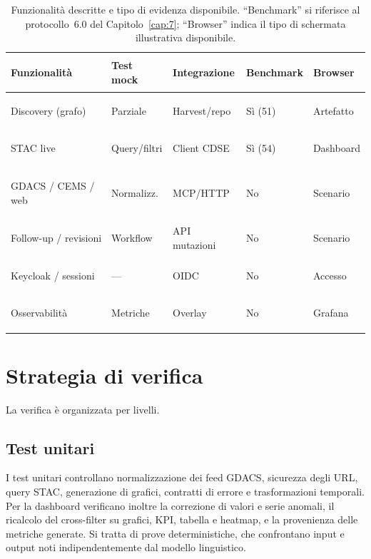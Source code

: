 \begin{table}[htbp]
\centering
\small
\begin{tabularx}{\textwidth}{
    >{\bfseries\raggedright\arraybackslash}p{}
    >{\centering\arraybackslash}p{}
    >{\centering\arraybackslash}p{}
    >{\centering\arraybackslash}p{}
    >{\raggedright\arraybackslash}X}
\toprule
Funzionalità & Test mock & Integrazione & Benchmark & Browser \\
\midrule
Discovery (grafo) & Parziale & Harvest/repo & Sì (51) & Artefatto \\
\addlinespace[1pt]
STAC live & Query/filtri & Client CDSE & Sì (54) & Dashboard \\
\addlinespace[1pt]
GDACS / CEMS / web & Normalizz. & MCP/HTTP & No & Scenario \\
\addlinespace[1pt]
Follow-up / revisioni & Workflow & API mutazioni & No & Scenario \\
\addlinespace[1pt]
Keycloak / sessioni & --- & OIDC & No & Accesso \\
\addlinespace[1pt]
Osservabilità & Metriche & Overlay & No & Grafana \\
\bottomrule
\end{tabularx}
\caption{Funzionalità descritte e tipo di evidenza disponibile. ``Benchmark''
si riferisce al protocollo~6.0 del Capitolo~\ref{cap:7}; ``Browser'' indica
il tipo di schermata illustrativa disponibile.}
\label{tab:funzionalita-evidenza}
\end{table}

\section{Strategia di verifica}

La verifica è organizzata per livelli.

\subsection{Test unitari}

I test unitari controllano normalizzazione dei feed GDACS, sicurezza degli URL,
query STAC, generazione di grafici, contratti di errore e trasformazioni
temporali. Per la dashboard verificano inoltre la correzione di valori e serie
anomali, il ricalcolo del cross-filter su grafici, KPI, tabella e heatmap, e
la provenienza delle metriche generate. Si tratta di prove deterministiche,
che confrontano input e output noti indipendentemente dal modello linguistico.

